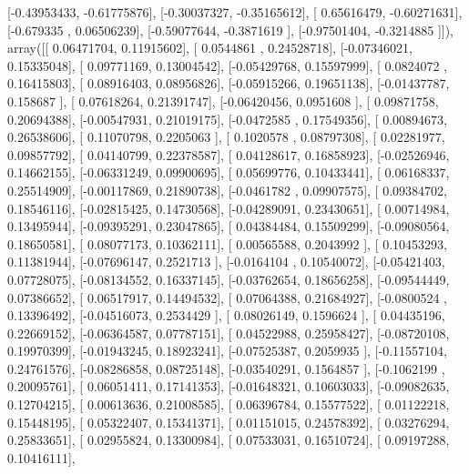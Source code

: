 \documentclass{article}
\begin{document}
       [-0.43953433, -0.61775876],
       [-0.30037327, -0.35165612],
       [ 0.65616479, -0.60271631],
       [-0.679335  ,  0.06506239],
       [-0.59077644, -0.3871619 ],
       [-0.97501404, -0.3214885 ]]), array([[ 0.06471704,  0.11915602],
       [ 0.0544861 ,  0.24528718],
       [-0.07346021,  0.15335048],
       [ 0.09771169,  0.13004542],
       [-0.05429768,  0.15597999],
       [ 0.0824072 ,  0.16415803],
       [ 0.08916403,  0.08956826],
       [-0.05915266,  0.19651138],
       [-0.01437787,  0.158687  ],
       [ 0.07618264,  0.21391747],
       [-0.06420456,  0.0951608 ],
       [ 0.09871758,  0.20694388],
       [-0.00547931,  0.21019175],
       [-0.0472585 ,  0.17549356],
       [ 0.00894673,  0.26538606],
       [ 0.11070798,  0.2205063 ],
       [ 0.1020578 ,  0.08797308],
       [ 0.02281977,  0.09857792],
       [ 0.04140799,  0.22378587],
       [ 0.04128617,  0.16858923],
       [-0.02526946,  0.14662155],
       [-0.06331249,  0.09900695],
       [ 0.05699776,  0.10433441],
       [ 0.06168337,  0.25514909],
       [-0.00117869,  0.21890738],
       [-0.0461782 ,  0.09907575],
       [ 0.09384702,  0.18546116],
       [-0.02815425,  0.14730568],
       [-0.04289091,  0.23430651],
       [ 0.00714984,  0.13495944],
       [-0.09395291,  0.23047865],
       [ 0.04384484,  0.15509299],
       [-0.09080564,  0.18650581],
       [ 0.08077173,  0.10362111],
       [ 0.00565588,  0.2043992 ],
       [ 0.10453293,  0.11381944],
       [-0.07696147,  0.2521713 ],
       [-0.0164104 ,  0.10540072],
       [-0.05421403,  0.07728075],
       [-0.08134552,  0.16337145],
       [-0.03762654,  0.18656258],
       [-0.09544449,  0.07386652],
       [ 0.06517917,  0.14494532],
       [ 0.07064388,  0.21684927],
       [-0.0800524 ,  0.13396492],
       [-0.04516073,  0.2534429 ],
       [ 0.08026149,  0.1596624 ],
       [ 0.04435196,  0.22669152],
       [-0.06364587,  0.07787151],
       [ 0.04522988,  0.25958427],
       [-0.08720108,  0.19970399],
       [-0.01943245,  0.18923241],
       [-0.07525387,  0.2059935 ],
       [-0.11557104,  0.24761576],
       [-0.08286858,  0.08725148],
       [-0.03540291,  0.1564857 ],
       [-0.1062199 ,  0.20095761],
       [ 0.06051411,  0.17141353],
       [-0.01648321,  0.10603033],
       [-0.09082635,  0.12704215],
       [ 0.00613636,  0.21008585],
       [ 0.06396784,  0.15577522],
       [ 0.01122218,  0.15448195],
       [ 0.05322407,  0.15341371],
       [ 0.01151015,  0.24578392],
       [ 0.03276294,  0.25833651],
       [ 0.02955824,  0.13300984],
       [ 0.07533031,  0.16510724],
       [ 0.09197288,  0.10416111],
\end{document}
